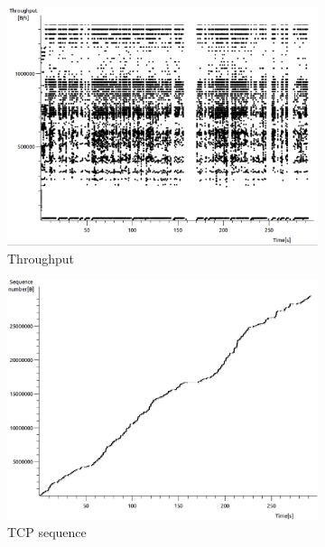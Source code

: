 \documentclass[conference,a4paper]{IEEEtran}
\begin{document}
\begin{figure}
 \centering
 \begin{subfigure}[b]{0.2\textwidth}
  \includegraphics[width=\textwidth]{s8-0_th}
  \caption{Throughput}
 \end{subfigure}
 \begin{subfigure}[b]{0.2\textwidth}
  \includegraphics[width=\textwidth]{s8-0_seq}
  \caption{TCP sequence}
 \end{subfigure}
 \begin{subfigure}[b]{0.2\textwidth}

\end{subfigure}
\end{figure}
\end{document}
